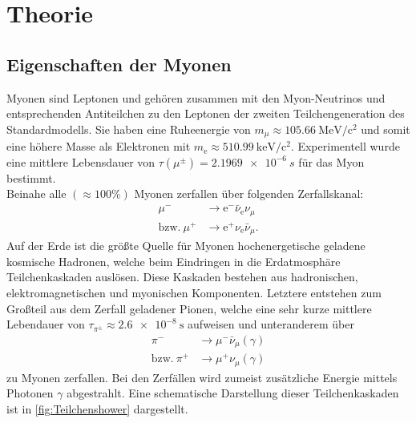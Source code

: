 \chapter{Theorie}
\label{cha:Theorie}

\section{Eigenschaften der Myonen}

Myonen sind Leptonen und gehören zusammen mit den Myon-Neutrinos und entsprechenden Antiteilchen zu den Leptonen der zweiten Teilchengeneration des Standardmodells.
Sie haben eine Ruheenergie von $m_{\mu} \approx \qty{105.66}{\mega\electronvolt}/\mathrm{c}^2$\cite{PDG} und somit eine höhere Masse als Elektronen mit $m_{\mathrm{e}} 
\approx \qty{510.99}{\kilo\electronvolt}/\mathrm{c}^2$\cite{PDG}. Experimentell wurde eine mittlere Lebensdauer von $\tau(\mu^{\pm}) = \qty{2.1969e-6}{s} $ \cite{PDG} für das Myon bestimmt.\\
Beinahe alle $(\approx 100 \%)$ Myonen zerfallen über folgenden Zerfallskanal\cite{PDG}:
\begin{align}
    \mu^{-} &\rightarrow \mathrm{e}^{-} \bar{\nu}_{\mathrm{e}}\nu_{\mu} \\
    \mathrm{bzw.} \ \mu^{+} &\rightarrow \mathrm{e}^{+}\nu_{\mathrm{e}} \bar{\nu}_{\mu}.
\end{align}
Auf der Erde ist die größte Quelle für Myonen hochenergetische geladene kosmische Hadronen, welche beim Eindringen in die Erdatmosphäre Teilchenkaskaden auslösen. 
Diese Kaskaden bestehen aus hadronischen, elektromagnetischen und myonischen Komponenten. Letztere entstehen zum Großteil aus dem Zerfall geladener Pionen, welche
eine sehr kurze mittlere Lebendauer von $\tau_{\pi^{\pm}} \approx \qty{2.6e-8}{\second}$\cite{PDG} aufweisen und unteranderem über
\begin{align}
    \pi^{-} &\rightarrow \mu^{-} \bar{\nu}_{\mu} (\gamma)\\
    \mathrm{bzw.} \ \pi^{+} &\rightarrow \mu^{+} {\nu}_{\mu} (\gamma)
\end{align}
zu Myonen zerfallen. Bei den Zerfällen wird zumeist zusätzliche Energie mittels Photonen $\gamma$ abgestrahlt. Eine schematische Darstellung dieser Teilchenkaskaden ist in \autoref{fig:Teilchenshower}
dargestellt.\\
